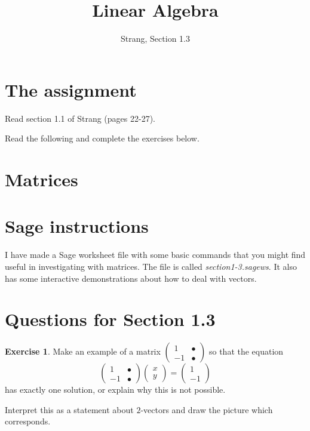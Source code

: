 \documentclass[11pt]{amsart}
\theoremstyle{definition}
\newtheorem{exercise}{Exercise}
\begin{document}
\title{Linear Algebra}
\author{Strang, Section 1.3}
\maketitle

\section{The assignment}
\begin{compactitem}
\item Read section 1.1 of Strang (pages 22-27).
\item Read the following and complete the exercises below.
\end{compactitem}

\section{Matrices}



\section{Sage instructions}

I have made a Sage worksheet file with some basic commands that you might find useful in investigating with matrices. The file is called \emph{section1-3.sagews}. It also has some interactive demonstrations about how to deal with vectors.


\section{Questions for Section 1.3}
\setcounter{exercise}{24}

\begin{exercise}
Make an example of a matrix $\left(\begin{smallmatrix} 1 & \bullet \\ -1 & \bullet \end{smallmatrix}\right)$ so that the equation
\[
\begin{pmatrix} 1 & \bullet \\ -1 & \bullet \end{pmatrix} \begin{pmatrix} x \\ y \end{pmatrix} = \begin{pmatrix} 1 \\ -1 \end{pmatrix}
\]
has exactly one solution, or explain why this is not possible.

Interpret this as a statement about $2$-vectors and draw the picture which corresponds.
\end{exercise}
\end{document}
